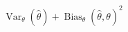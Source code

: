 \documentclass{article}
\begin{document}
\[
\operatorname{Var}_{\theta}(\hat{\theta}) + \operatorname{Bias}_{\theta}(\hat{\theta}, \theta)^2
\]
\end{document}

